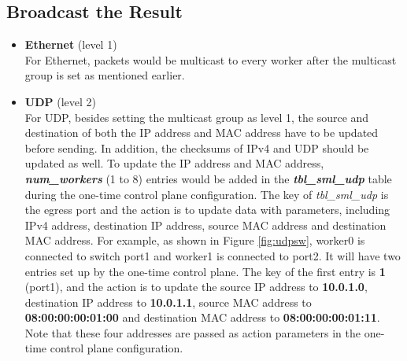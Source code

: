 \documentclass[a4paper,11pt]{article}
\begin{document}
\subsection{Broadcast the Result}
\label{sec:Broadcast}
\begin{itemize}
    \item \textbf{Ethernet} (level 1) \\
    For Ethernet, packets would be multicast to every worker after the multicast group is set as mentioned earlier.
    \item \textbf{UDP} (level 2) \\
    \label{broadcastudp}
    For UDP, besides setting the multicast group as level 1, the source and destination of both the IP address and MAC address have to be updated before sending. In addition, the checksums of IPv4 and UDP should be updated as well. To update the IP address and MAC address, \textit{\textbf{num\_workers}} (1 to 8) entries would be added in the \textbf{\textit{tbl\_sml\_udp}} table during the one-time control plane configuration. The key of \textit{tbl\_sml\_udp} is the egress port and the action is to update data with parameters, including IPv4 address, destination IP address, source MAC address and destination MAC address. For example, as shown in Figure \ref{fig:udpsw}, worker0 is connected to switch port1 and worker1 is connected to port2. It will have two entries set up by the one-time control plane. The key of the first entry is \textbf{1} (port1), and the action is to update the source IP address to \textbf{10.0.1.0}, destination IP address to \textbf{10.0.1.1}, source MAC address to \textbf{08:00:00:00:01:00} and destination MAC address to \textbf{08:00:00:00:01:11}. Note that these four addresses are passed as action parameters in the one-time control plane configuration.
\end{itemize}

\newpage
\end{document}
